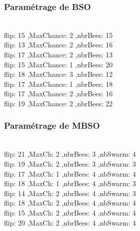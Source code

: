 \noindent
\begin{minipage}[t]{0.5\textwidth}
\subsubsection{Paramétrage de BSO}
\vspace{-0.5cm}
\textbf{}\\
flip: 15 ,MaxChance: 2 ,nbrBees: 15\\
flip: 13 ,MaxChance: 2 ,nbrBees: 16\\
flip: 17 ,MaxChance: 2 ,nbrBees: 13\\
flip: 15 ,MaxChance: 1 ,nbrBees: 20\\
flip: 18 ,MaxChance: 3 ,nbrBees: 12\\
flip: 17 ,MaxChance: 1 ,nbrBees: 18\\
flip: 17 ,MaxChance: 2 ,nbrBees: 16\\
flip: 19 ,MaxChance: 2 ,nbrBees: 22 
\end{minipage}\hfill
\hspace{0.5cm}
\begin{minipage}[t]{0.6\textwidth}
\subsubsection{Paramétrage de MBSO}
\vspace{-0.5cm}
\textbf{}\\
flip: 21 ,MaxCh: 2 ,nbrBees: 3 ,nbSwarm: 4\\
flip: 19 ,MaxCh: 2 ,nbrBees: 3 ,nbSwarm: 3\\
flip: 17 ,MaxCh: 1 ,nbrBees: 4 ,nbSwarm: 4\\
flip: 18 ,MaxCh: 1 ,nbrBees: 4 ,nbSwarm: 3\\
flip: 14 ,MaxCh: 2 ,nbrBees: 4 ,nbSwarm: 3\\
flip: 18 ,MaxCh: 2 ,nbrBees: 4 ,nbSwarm: 4\\
flip: 15 ,MaxCh: 2 ,nbrBees: 4 ,nbSwarm: 4\\
flip: 20 ,MaxCh: 2 ,nbrBees: 4 ,nbSwarm: 4
\end{minipage}\hfill


\textbf{ }

 
 
